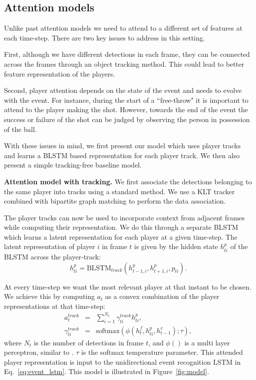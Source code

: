 \subsection{Attention models}
Unlike past attention models \cite{Bahdnau_arxiv14,Xu_arxiv15,Yao_arxiv15} we need to attend to a different set of
features at each time-step. There are two key issues to address in this
setting.

First, although we have different detections in each frame, they
can be connected across the frames through an object tracking
method. This could lead to better feature representation of the
players.

Second, player attention depends on the state of the event and needs to evolve
with the event.  For instance, during the start of a ``free-throw" it is
important to attend to the player making the shot. However, towards the end of
the event the success or failure of the shot can be judged by observing the
person in possession of the ball.

With these issues in mind, we first present our model which uses player tracks
and learns a BLSTM based representation for each player track. We then
also
present a simple tracking-free baseline model.

\noindent \textbf{Attention model with tracking.}
We first associate the detections
belonging to the same player into tracks using a standard
method. We use a KLT tracker combined with
bipartite graph matching \cite{Munkres_1957} to perform the data association.

The player tracks can now be used to incorporate context
from adjacent frames while computing their representation.
We do this through a separate BLSTM which learns a latent
representation for each player at a given time-step.
The latent representation of player $i$ in frame $t$ is
given by the hidden state
$h_{ti}^p$ of the BLSTM across the player-track:
\begin{equation}
  h_{ti}^p = \mbox{BLSTM}_{track}(h_{t-1,i}^p, h_{t+1,i}^p, p_{ti}).
\end{equation}

At every time-step we want the most relevant player at that
instant to be chosen. We achieve this by computing
$a_t$ as a convex combination of the player representations
at that time-step:
\begin{eqnarray} 
\label{eq:track}
  a_t^{track} & = & \sum_{i=1}^{N_t} \gamma_{ti}^{track} h_{ti}^p, \\ \nonumber
  \gamma_{ti}^{track} & = & \text{softmax} \left(\phi\left(h^f_t, h^p_{ti}, h^e_{t-1}\right); \tau\right),
\end{eqnarray}where $N_t$ is the number of detections in frame $t$, and $\phi()$ is a 
multi layer perceptron, similar to \cite{Bahdnau_arxiv14}. $\tau$ is the softmax temperature parameter.
This attended player representation is input to the
unidirectional event recognition LSTM in Eq.~\ref{eq:event_lstm}.
This model is illustrated in Figure~\ref{fig:model}.

